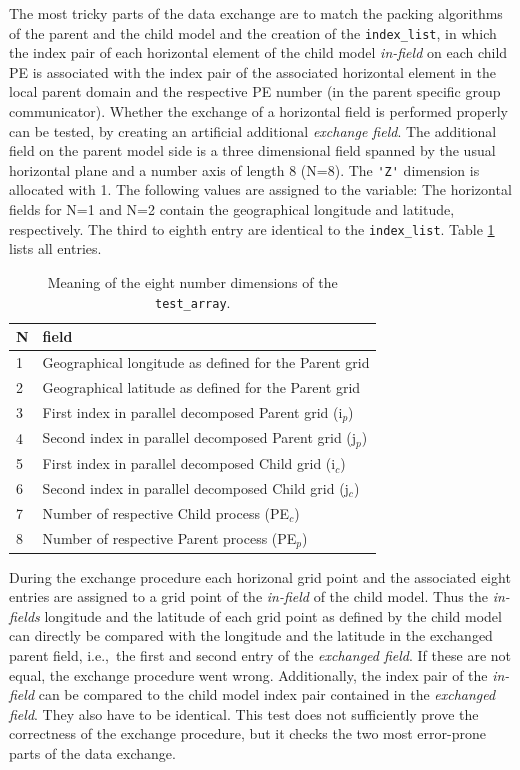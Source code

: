\documentclass[twoside]{article}
\begin{document}
The most tricky parts of the data exchange are to match the packing algorithms
 of the parent and the child model and the creation of the \verb|index_list|,
 in which the index pair of each horizontal element of the child model
 {\it in-field} on each child PE is associated with the index pair of
 the associated horizontal 
 element in the local parent domain and the respective PE number (in
 the parent specific group communicator).
Whether the exchange of a horizontal field is performed properly can be tested,
by creating an artificial additional {\it exchange field}. The additional field 
on the parent model side is a three dimensional field spanned by the usual 
horizontal plane and a number axis of length 8 (N=8). 
The \verb|'Z'| dimension is allocated with 1. 
The following values are assigned to the variable:
The horizontal fields for N=1 and N=2 contain the geographical longitude and 
latitude, respectively.
The third to eighth entry are identical to the \verb|index_list|.
Table \ref{tab:testarray} lists all entries. 
\begin{table}
\caption{Meaning of the eight number dimensions of the {\tt test\_array}.}
\label{tab:testarray}
\begin{center}
\begin{tabular}{lp{9cm}}
\hline
N & field \\ \hline
1 & Geographical longitude as defined for the Parent grid\\
2 & Geographical latitude as defined for the Parent grid\\
3 & First index in parallel decomposed Parent grid (i$_p$)\\
4 & Second index in parallel decomposed Parent grid (j$_p$)\\
5 & First index in parallel decomposed Child grid (i$_c$)\\
6 & Second index in parallel decomposed Child grid (j$_c$)\\
7 & Number of respective Child process (PE$_c$)\\
8 & Number of respective Parent process (PE$_p$)\\\hline
\end{tabular}
\end{center}
\end{table}

During the exchange procedure each horizonal grid point and the associated
eight entries are assigned to a grid point of the {\it in-field} of the 
child model. Thus the  {\it in-fields} longitude and the latitude of
each grid point as defined by the child model can directly be compared
with the longitude  
and the latitude in the exchanged parent field, i.e.,\ the first and
 second entry of the {\it exchanged field}. If these are not equal, the exchange
 procedure went wrong. 
Additionally, the index pair of the {\it in-field} can be 
compared to the child model index pair contained in the {\it exchanged
field}. They also have to be identical.
This test does not sufficiently prove the correctness of the exchange
procedure, 
but it checks the two most error-prone parts of the data exchange.
\end{document}
